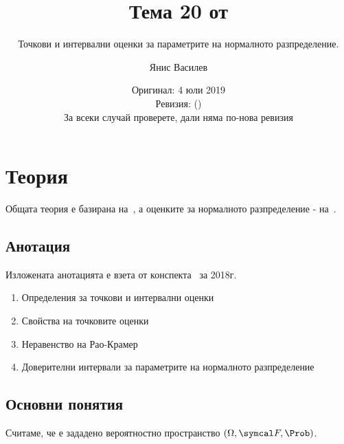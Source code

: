 \documentclass[numbers=endperiod, bibliography=totocnumbered]{scrartcl}
\title{Тема 20 от \URL{https://github.com/v--/se2018}}
\subtitle{Точкови и интервални оценки за параметрите на нормалното разпределение.}
\author{Янис Василев}
\date{Оригинал: 4 юли 2019 \\ Ревизия: \gitAbbrevHash{} (\gitAuthorDate) \\ За всеки случай проверете, дали няма по-нова ревизия}
\begin{document}
\maketitle

\section{Теория}

Общата теория е базирана на~\cite{DimitrovYanev}, а оценките за нормалното разпределение - на~\cite{ASLectures}.

\subsection{Анотация}

Изложената анотацията е взета от конспекта~\cite{Syllabus} за 2018г.

\begin{enumerate}
  \item Определения за точкови и интервални оценки
  \item Свойства на точковите оценки
  \item Неравенство на Рао-Крамер
  \item Доверителни интервали за параметрите на нормалното разпределение
\end{enumerate}

\subsection{Основни понятия}

Считаме, че е зададено вероятностно пространство \( (\Omega, \F, \Prob) \).
\end{document}
